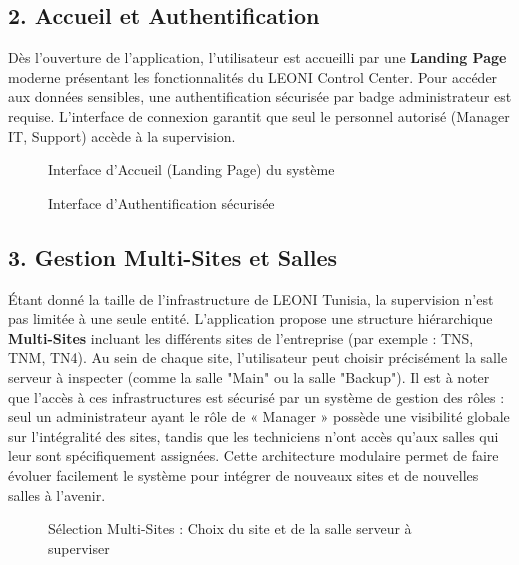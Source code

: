 \documentclass[12pt,a4paper]{report}
\begin{document}
\subsection{2. Accueil et Authentification}
Dès l'ouverture de l'application, l'utilisateur est accueilli par une \textbf{Landing Page} moderne présentant les fonctionnalités du LEONI Control Center. Pour accéder aux données sensibles, une authentification sécurisée par badge administrateur est requise. L'interface de connexion garantit que seul le personnel autorisé (Manager IT, Support) accède à la supervision.

\begin{figure}[h]
    \centering
    \caption{Interface d'Accueil (Landing Page) du système}
\end{figure}

\begin{figure}[h]
    \centering
    \caption{Interface d'Authentification sécurisée}
\end{figure}

\subsection{3. Gestion Multi-Sites et Salles}
Étant donné la taille de l'infrastructure de LEONI Tunisia, la supervision n'est pas limitée à une seule entité. L'application propose une structure hiérarchique \textbf{Multi-Sites} incluant les différents sites de l'entreprise (par exemple : TNS, TNM, TN4). Au sein de chaque site, l'utilisateur peut choisir précisément la salle serveur à inspecter (comme la salle "Main" ou la salle "Backup"). Il est à noter que l'accès à ces infrastructures est sécurisé par un système de gestion des rôles : seul un administrateur ayant le rôle de « Manager » possède une visibilité globale sur l'intégralité des sites, tandis que les techniciens n'ont accès qu'aux salles qui leur sont spécifiquement assignées. Cette architecture modulaire permet de faire évoluer facilement le système pour intégrer de nouveaux sites et de nouvelles salles à l'avenir.

\begin{figure}[h]
    \centering
    \caption{Sélection Multi-Sites : Choix du site et de la salle serveur à superviser}
\end{figure}
\end{document}
